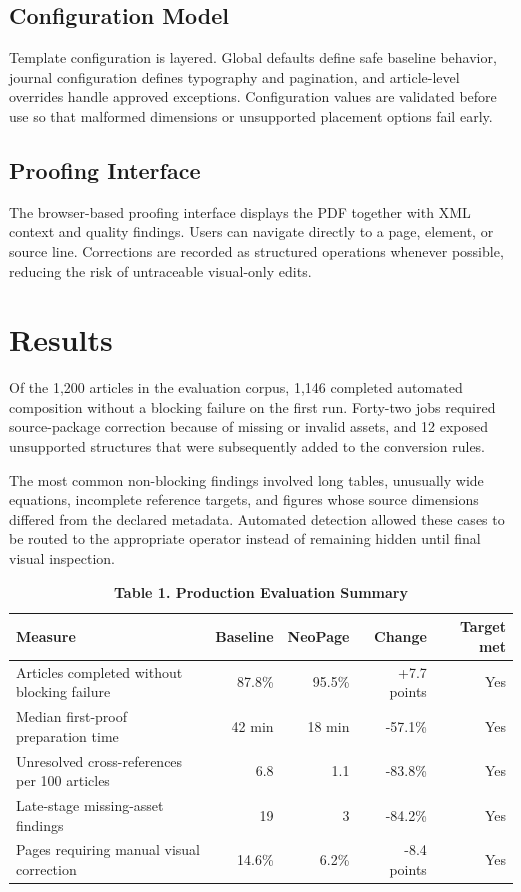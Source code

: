 \documentclass{tnqjournal}
\begin{document}
\subsection{Configuration Model}
Template configuration is layered. Global defaults define safe baseline behavior, journal configuration defines typography and pagination, and article-level overrides handle approved exceptions. Configuration values are validated before use so that malformed dimensions or unsupported placement options fail early.

\subsection{Proofing Interface}
The browser-based proofing interface displays the PDF together with XML context and quality findings. Users can navigate directly to a page, element, or source line. Corrections are recorded as structured operations whenever possible, reducing the risk of untraceable visual-only edits.

\section{Results}
Of the 1,200 articles in the evaluation corpus, 1,146 completed automated composition without a blocking failure on the first run. Forty-two jobs required source-package correction because of missing or invalid assets, and 12 exposed unsupported structures that were subsequently added to the conversion rules.

The most common non-blocking findings involved long tables, unusually wide equations, incomplete reference targets, and figures whose source dimensions differed from the declared metadata. Automated detection allowed these cases to be routed to the appropriate operator instead of remaining hidden until final visual inspection.

\begin{table}[t]
\centering
\fontsize{7.3}{8.5}\selectfont
\caption*{\textbf{Table 1. Production Evaluation Summary}}
\begin{tabularx}{\textwidth}{@{}Xrrrr@{}}
\toprule
\textbf{Measure} & \textbf{Baseline} & \textbf{NeoPage} & \textbf{Change} & \textbf{Target met}\\
\midrule
Articles completed without blocking failure & 87.8\% & 95.5\% & +7.7 points & Yes\\
Median first-proof preparation time & 42 min & 18 min & -57.1\% & Yes\\
Unresolved cross-references per 100 articles & 6.8 & 1.1 & -83.8\% & Yes\\
Late-stage missing-asset findings & 19 & 3 & -84.2\% & Yes\\
Pages requiring manual visual correction & 14.6\% & 6.2\% & -8.4 points & Yes\\
\bottomrule
\end{tabularx}
\end{table}
\end{document}
